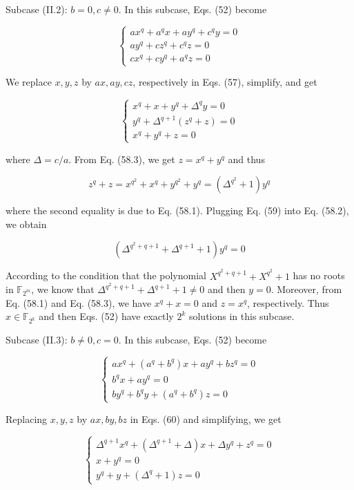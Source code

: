 \documentclass[10pt]{article}
\begin{document}
Subcase (II.2): $b=0, c \neq 0$. In this subcase, Eqs. (52) become

\[
\left\{\begin{array}{l}
a x^{q}+a^{q} x+a y^{q}+c^{q} y=0  \tag{57.1}\\
a y^{q}+c z^{q}+c^{q} z=0 \\
c x^{q}+c y^{q}+a^{q} z=0
\end{array}\right.
\]

We replace $x, y, z$ by $a x, a y, c z$, respectively in Eqs. (57), simplify, and get

\[
\left\{\begin{array}{l}
x^{q}+x+y^{q}+\Delta^{q} y=0  \tag{58.1}\\
y^{q}+\Delta^{q+1}\left(z^{q}+z\right)=0 \\
x^{q}+y^{q}+z=0
\end{array}\right.
\]

where $\Delta=c / a$. From Eq. (58.3), we get $z=x^{q}+y^{q}$ and thus


\begin{equation*}
z^{q}+z=x^{q^{2}}+x^{q}+y^{q^{2}}+y^{q}=\left(\Delta^{q^{2}}+1\right) y^{q} \tag{59}
\end{equation*}


where the second equality is due to Eq. (58.1). Plugging Eq. (59) into Eq. (58.2), we obtain

$$
\left(\Delta^{q^{2}+q+1}+\Delta^{q+1}+1\right) y^{q}=0
$$

According to the condition that the polynomial $X^{q^{2}+q+1}+X^{q^{2}}+1$ has no roots in $\mathbb{F}_{2^{m}}$, we know that $\Delta^{q^{2}+q+1}+\Delta^{q+1}+1 \neq 0$ and then $y=0$. Moreover, from Eq. (58.1) and Eq. (58.3), we have $x^{q}+x=0$ and $z=x^{q}$, respectively. Thus $x \in \mathbb{F}_{2^{k}}$ and then Eqs. (52) have exactly $2^{k}$ solutions in this subcase.

Subcase (II.3): $b \neq 0, c=0$. In this subcase, Eqs. (52) become

\[
\left\{\begin{array}{l}
a x^{q}+\left(a^{q}+b^{q}\right) x+a y^{q}+b z^{q}=0  \tag{60.1}\\
b^{q} x+a y^{q}=0 \\
b y^{q}+b^{q} y+\left(a^{q}+b^{q}\right) z=0
\end{array}\right.
\]

Replacing $x, y, z$ by $a x, b y, b z$ in Eqs. (60) and simplifying, we get

\[
\left\{\begin{array}{l}
\Delta^{q+1} x^{q}+\left(\Delta^{q+1}+\Delta\right) x+\Delta y^{q}+z^{q}=0  \tag{61.1}\\
x+y^{q}=0 \\
y^{q}+y+\left(\Delta^{q}+1\right) z=0
\end{array}\right.
\]
\end{document}
